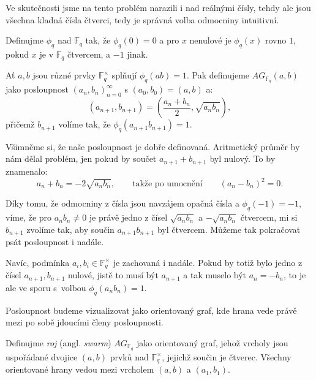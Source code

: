 \documentclass[12pt]{report}
\begin{document}
\begin{poznamka}
Ve skutečnosti jsme na tento problém narazili i nad reálnými čísly, tehdy ale jsou všechna kladná čísla čtverci, tedy je správná volba odmocniny intuitivní.
\end{poznamka}

\begin{definice}
Definujme  $\phi_q$ nad $\mathbb{F}_q$ tak, že $\phi_q(0) = 0$ a pro $x$ nenulové je $\phi_q(x)$ rovno $1$, pokud $x$ je v $\mathbb{F}_q$ čtvercem,  a $-1$ jinak.
\end{definice}

\begin{definice}
Ať $a,b$ jsou různé prvky $\mathbb{F}_q ^{\times}$ splňují $\phi_q (ab) = 1$. Pak definujeme $AG_{\mathbb{F}_q}(a,b)$ jako posloupnost $(a_n,b_n)_{n=0}^{\infty}$ s $(a_0,b_0) = (a,b)$ a:
\begin{equation*}
\left(a_{n+1},b_{n+1} \right) = \left(\frac{a_n+b_n}{2}, \sqrt{a_n b_n} \right),
\end{equation*}
přičemž $b_{n+1}$ volíme tak, že $\phi_q (a_{n+1} b_{n+1}) = 1$.
\end{definice}
Všimněme si, že naše posloupnost je dobře definovaná. Aritmetický průměr by nám dělal problém, jen pokud by součet $a_{n+1} + b_{n+1}$ byl nulový. To by znamenalo:
$$a_{n}+b_{n} = - 2\sqrt{a_n b_n}, \qquad \text{takže po umocnění} \qquad (a_n - b_n)^2 = 0.$$

Díky tomu, že odmocniny z čísla jsou navzájem opačná čísla a $\phi_q(-1)=-1$, víme, že pro $a_n b_n \neq 0$ je právě jedno z čísel $\sqrt{a_n b_n}$ a $-\sqrt{a_n b_n}$ čtvercem, mi si $b_{n+1}$ zvolíme tak, aby součin $a_{n+1} b_{n+1}$ byl čtvercem. Můžeme tak pokračovat psát posloupnost i nadále.

Navíc, podmínka $a_i,b_i \in \mathbb{F}_q ^{\times}$ je zachovaná i nadále. Pokud by totiž bylo jedno z čísel $a_{n+1},b_{n+1}$ nulové, jistě to musí být $a_{n+1}$ a tak muselo být $a_{n} = - b_n$, to je ale ve sporu s~volbou $\phi_q (a_n b_n) = 1$. 

Posloupnost budeme vizualizovat jako orientovaný graf, kde hrana vede právě mezi po sobě jdoucími členy posloupnosti.
\begin{definice}
Definujme \textit{roj} (angl. \textit{swarm}) $AG_{\mathbb{F}_q}$ jako orientovaný graf, jehož vrcholy jsou uspořádané dvojice $(a,b)$ prvků nad $\mathbb{F}_q ^{\times}$, jejichž součin je čtverec. Všechny orientované hrany vedou mezi vrcholem $(a,b)$ a $(a_1,b_1)$.
\end{definice}
\end{document}
